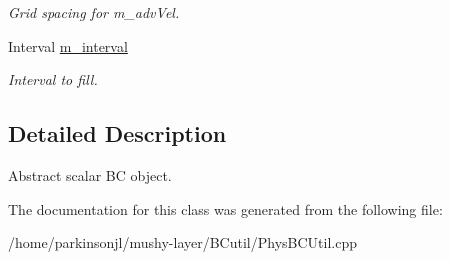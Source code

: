 \begin{DoxyCompactItemize}
\begin{DoxyCompactList}\small\item\em Grid spacing for m\-\_\-adv\-Vel. \end{DoxyCompactList}\item 
\hypertarget{class_abstract_scalar_b_c_function_aeac3053b146f1138f2336e7d6562bf97}{Interval \hyperlink{class_abstract_scalar_b_c_function_aeac3053b146f1138f2336e7d6562bf97}{m\-\_\-interval}}\label{class_abstract_scalar_b_c_function_aeac3053b146f1138f2336e7d6562bf97}

\begin{DoxyCompactList}\small\item\em Interval to fill. \end{DoxyCompactList}\end{DoxyCompactItemize}


\subsection{Detailed Description}
Abstract scalar B\-C object. 

The documentation for this class was generated from the following file\-:\begin{DoxyCompactItemize}
\item 
/home/parkinsonjl/mushy-\/layer/\-B\-Cutil/Phys\-B\-C\-Util.\-cpp\end{DoxyCompactItemize}
